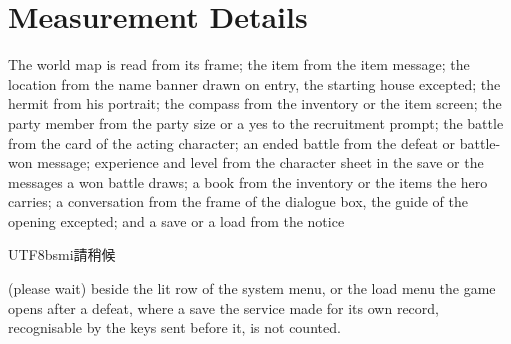 \documentclass{article} %
\newcommand{\game}[1]{\begin{CJK}{UTF8}{bsmi}#1\end{CJK}}
\begin{document}
\section{Measurement Details}
\label{app:measure}

The world map is read from its frame; the item from the item message; the location from the name banner drawn on entry, the starting house excepted; the hermit from his portrait; the compass from the inventory or the item screen; the party member from the party size or a yes to the recruitment prompt; the battle from the card of the acting character; an ended battle from the defeat or battle-won message; experience and level from the character sheet in the save or the messages a won battle draws; a book from the inventory or the items the hero carries; a conversation from the frame of the dialogue box, the guide of the opening excepted; and a save or a load from the notice \game{請稍候} (please wait) beside the lit row of the system menu, or the load menu the game opens after a defeat, where a save the service made for its own record, recognisable by the keys sent before it, is not counted.
\end{document}
